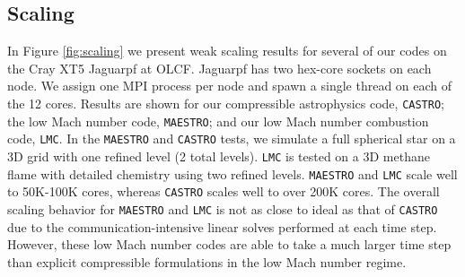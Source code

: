 \subsection{Scaling}

In Figure \ref{fig:scaling} we present weak scaling results for several of our codes on 
the Cray XT5 Jaguarpf at OLCF. Jaguarpf has two hex-core sockets on each node. We assign 
one MPI process per node and spawn a single thread on each of the 12 cores. Results are 
shown for our compressible astrophysics code, {\tt CASTRO}; the low Mach number code, 
{\tt MAESTRO}; and our low Mach number combustion code, {\tt LMC}. In the {\tt MAESTRO} 
and {\tt CASTRO} tests, we simulate a full spherical star on a 3D grid with one refined 
level (2 total levels).  {\tt LMC} is tested on a 3D methane flame with detailed chemistry 
using two refined levels. {\tt MAESTRO} and {\tt LMC} scale well to 50K-100K cores, 
whereas {\tt CASTRO} scales well to over 200K cores. The overall scaling behavior 
for {\tt MAESTRO} and {\tt LMC} is not as close to ideal as that of {\tt CASTRO} 
due to the communication-intensive linear solves performed at each time step. However, 
these low Mach number codes are able to take a much larger time step than explicit 
compressible formulations in the low Mach number regime. 
